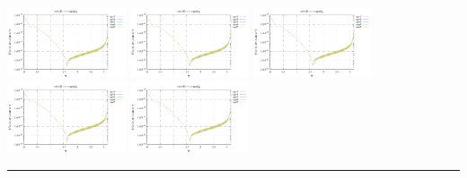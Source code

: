 \noindent
\includegraphics[width=3.5cm]{python_codes/fieldstone_152/RESULTS/exp2/sr2_64_m2}
\includegraphics[width=3.5cm]{python_codes/fieldstone_152/RESULTS/exp2/sr2_64_m3}
\includegraphics[width=3.5cm]{python_codes/fieldstone_152/RESULTS/exp2/sr2_64_m4}
\includegraphics[width=3.5cm]{python_codes/fieldstone_152/RESULTS/exp2/sr2_64_m5}
\includegraphics[width=3.5cm]{python_codes/fieldstone_152/RESULTS/exp2/sr2_64_m6}

\hrule

